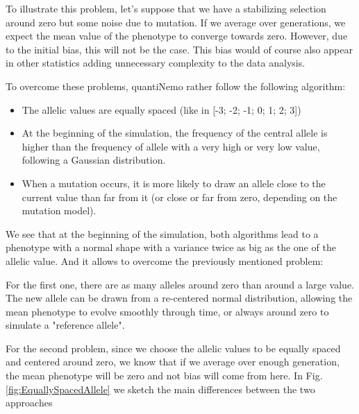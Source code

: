 \documentclass[letterpaper,12pt,oneside]{book}
\begin{document}
\begin{appendices}
To illustrate this problem, let's suppose that we have a stabilizing selection around zero but some noise due to mutation. If we average over generations, we expect the mean value of the phenotype to converge towards zero. However, due to the initial bias, this will not be the case. This bias would of course also appear in other statistics adding unnecessary complexity to the data analysis.   

To overcome these problems, quantiNemo rather follow the following algorithm:
\begin{itemize}
\item	The allelic values are equally spaced (like in [-3; -2; -1; 0; 1; 2; 3])
\item	 At the beginning of the simulation, the frequency of the central allele is higher than the frequency of allele with a very high or very low value, following a Gaussian distribution. 
\item	When a mutation occurs, it is more likely to draw an allele close to the current value than far from it (or close or far from zero, depending on the mutation model). 
\end{itemize}

We see that at the beginning of the simulation, both algorithms lead to a phenotype with a normal shape with a variance twice as big as the one of the allelic value. And it allows to overcome the previously mentioned problem:

For the first one, there are as many alleles around zero than around a large value. The new allele can be drawn from a re-centered normal distribution, allowing the mean phenotype to evolve smoothly through time, or always around zero to simulate a "reference allele". 

For the second problem, since we choose the allelic values to be equally spaced and centered around zero, we know that if we average over enough generation, the mean phenotype will be zero and not bias will come from here. In Fig. \ref{fig:EquallySpacedAllele} we sketch the main differences between the two approaches


\end{appendices}
\end{document}
